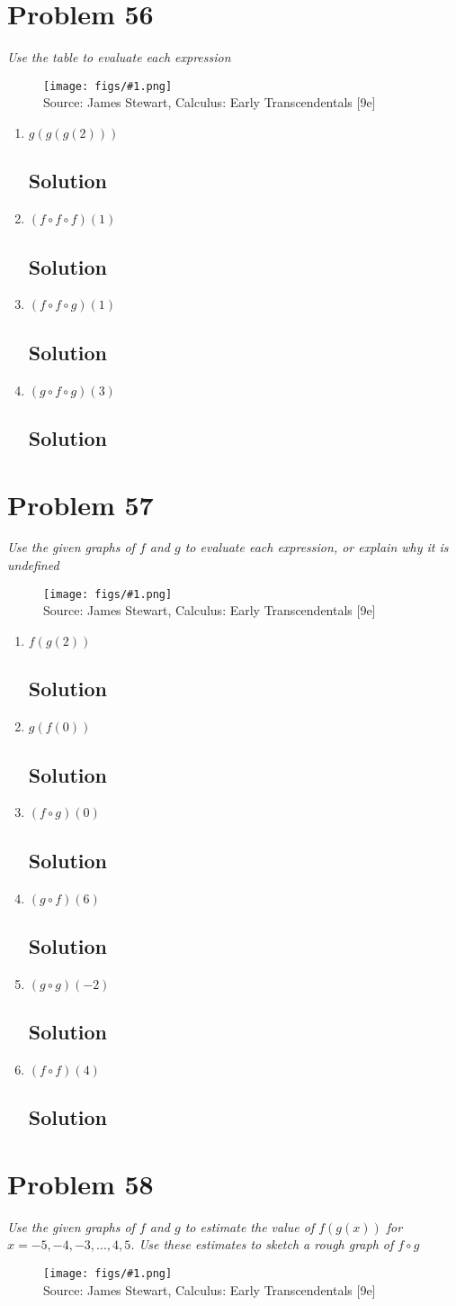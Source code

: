 \documentclass[11pt]{article}
\newcommand{\soln}{\subsection*}
\newcommand{\qn}{\textit}
\newcommand{\imagesource}[1]{{\footnotesize Source: #1}}
\newcommand{\imgqn}[1]{
	\begin{figure}[H]
		\centering
		\texttt{[image: figs/\#1.png]}\\
		\imagesource{James Stewart, Calculus: Early Transcendentals [9e]}
	\end{figure}
}
\begin{document}
\section*{Problem 56}

\qn{Use the table to evaluate each expression}
\imgqn{1.3.55+56}

\begin{enumerate}
	\item \qn{$g(g(g(2)))$}
	\soln{Solution}
	
	\item \qn{$(f \circ f \circ f)(1)$}
	\soln{Solution}
	
	\item \qn{$(f \circ f \circ g)(1)$}
	\soln{Solution}
	
	\item \qn{$(g \circ f \circ g)(3)$}
	\soln{Solution}
\end{enumerate}

\section*{Problem 57}

\qn{Use the given graphs of $f$ and $g$ to evaluate each expression, or explain why it is undefined}
\imgqn{1.3.57}

\begin{enumerate}
	\item \qn{$f(g(2))$}
	\soln{Solution}
	
	\item \qn{$g(f(0))$}
	\soln{Solution}
	
	\item \qn{$(f \circ g)(0)$}
	\soln{Solution}
	
	\item \qn{$(g \circ f)(6)$}
	\soln{Solution}
	
	\item \qn{$(g \circ g)(-2)$}
	\soln{Solution}
	
	\item \qn{$(f \circ f)(4)$}
	\soln{Solution}
\end{enumerate}

\section*{Problem 58}

\qn{Use the given graphs of $f$ and $g$ to estimate the value of $f(g(x))$ for $x=-5,-4,-3,...,4,5$. Use these estimates to sketch a rough graph of $f \circ g$}
\imgqn{1.3.58}
\end{document}
